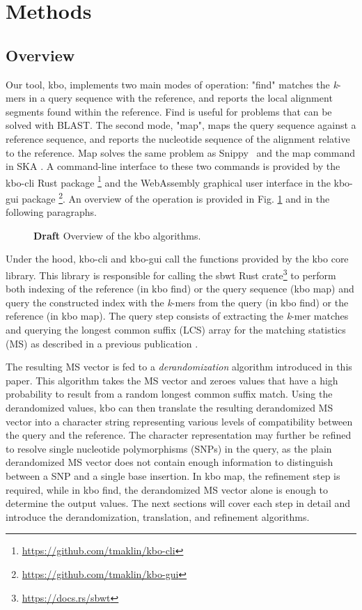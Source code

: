 \documentclass[unnumsec,webpdf,contemporary,large]{oup-authoring-template}%
\theoremstyle{thmstyleone}%
\theoremstyle{thmstyletwo}%
\theoremstyle{thmstylethree}%
\begin{document}
\section{Methods}\label{methods}
\subsection{Overview}

Our tool, {\sf kbo}, implements two main modes of operation: "find" matches the \emph{k}-mers in a query sequence with the reference, and reports the local alignment segments found within the reference. Find is useful for problems that can be solved with BLAST. The second mode, "map", maps the query sequence against a reference sequence, and reports the nucleotide sequence of the alignment relative to the reference. Map solves the same problem as Snippy~\cite{seemann2015snippy} and the map command in SKA \cite{derelle2024seamless}. A command-line interface to these two commands is provided by the kbo-cli Rust package \footnote{\url{https://github.com/tmaklin/kbo-cli}} and the WebAssembly graphical user interface in the kbo-gui package \footnote{\url{https://github.com/tmaklin/kbo-gui}}. An overview of the operation is provided in Fig. \ref{fig1} and in the following paragraphs.
\begin{figure}[!t]%
\centering
{}
\caption{\textbf{Draft} Overview of the {\sf kbo} algorithms.}\label{fig1}
\end{figure}

Under the hood, kbo-cli and kbo-gui call the functions provided by the kbo core library. This library is responsible for calling the sbwt Rust crate\footnote{\url{https://docs.rs/sbwt}} to perform both indexing of the reference (in kbo find) or the query sequence (kbo map) and query the constructed index with the \emph{k}-mers from the query (in kbo find) or the reference (in kbo map). The query step consists of extracting the \emph{k}-mer matches and querying the longest common suffix (LCS) array for the matching statistics (MS) as described in a previous publication \cite{alanko2024finimizers}.

The resulting MS vector is fed to a \emph{derandomization} algorithm introduced in this paper. This algorithm takes the MS vector and zeroes values that have a high probability to result from a random longest common suffix match. Using the derandomized values, {\sf kbo} can then translate the resulting derandomized MS vector into a character string representing various levels of compatibility between the query and the reference. The character representation may further be refined to resolve single nucleotide polymorphisms (SNPs) in the query, as the plain derandomized MS vector does not contain enough information to distinguish between a SNP and a single base insertion. In kbo map, the refinement step is required, while in kbo find, the derandomized MS vector alone is enough to determine the output values. The next sections will cover each step in detail and introduce the derandomization, translation, and refinement algorithms.
\end{document}
